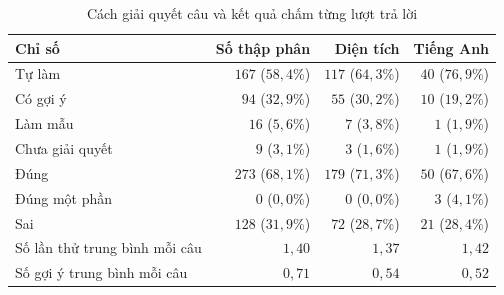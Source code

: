 \begin{table}[H]
\centering
\caption{Cách giải quyết câu và kết quả chấm từng lượt trả lời}\label{tab:db-results}
\begin{tabular}{lrrr}
\toprule
Chỉ số & Số thập phân & Diện tích & Tiếng Anh \\
\midrule
Tự làm & $167$ ($58{,}4$\%) & $117$ ($64{,}3$\%) & $40$ ($76{,}9$\%) \\
Có gợi ý & $94$ ($32{,}9$\%) & $55$ ($30{,}2$\%) & $10$ ($19{,}2$\%) \\
Làm mẫu & $16$ ($5{,}6$\%) & $7$ ($3{,}8$\%) & $1$ ($1{,}9$\%) \\
Chưa giải quyết & $9$ ($3{,}1$\%) & $3$ ($1{,}6$\%) & $1$ ($1{,}9$\%) \\
\midrule
Đúng & $273$ ($68{,}1$\%) & $179$ ($71{,}3$\%) & $50$ ($67{,}6$\%) \\
Đúng một phần & $0$ ($0{,}0$\%) & $0$ ($0{,}0$\%) & $3$ ($4{,}1$\%) \\
Sai & $128$ ($31{,}9$\%) & $72$ ($28{,}7$\%) & $21$ ($28{,}4$\%) \\
\midrule
Số lần thử trung bình mỗi câu & $1{,}40$ & $1{,}37$ & $1{,}42$ \\
Số gợi ý trung bình mỗi câu & $0{,}71$ & $0{,}54$ & $0{,}52$ \\
\bottomrule
\end{tabular}
\end{table}
